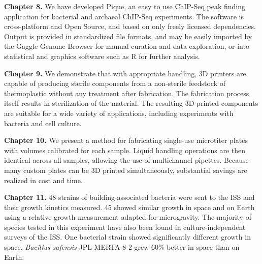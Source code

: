 \noindent\textbf{Chapter 8.} We have developed Pique, an easy to use ChIP-Seq
peak finding application for bacterial and archaeal ChIP-Seq experiments. The
software is cross-platform and Open Source, and based on only freely licensed
dependencies. Output is provided in standardized file formats, and may be
easily imported by the Gaggle Genome Browser for manual curation and data
exploration, or into statistical and graphics software such as R for further
analysis.


\noindent\textbf{Chapter 9.} We demonstrate that with
appropriate handling, 3D printers are capable of producing sterile components
from a non-sterile feedstock of thermoplastic without any treatment after
fabrication. The fabrication process itself results in sterilization of the
material. The resulting 3D printed components are suitable for a wide variety
of applications, including experiments with bacteria and cell culture.

\noindent\textbf{Chapter 10.} We present a method for
fabricating single-use microtiter plates with volumes calibrated for each
sample. Liquid handling operations are then identical across all samples,
allowing the use of multichannel pipettes. Because many custom plates can be
3D printed simultaneously, substantial savings are realized in cost and time.


\noindent\textbf{Chapter 11.} 48 strains of building-associated
bacteria were sent to the ISS and their growth kinetics measured. 45 showed
similar growth in space and on Earth using a relative growth measurement
adapted for microgravity. The majority of species tested in this experiment
have also been found in culture-independent surveys of the ISS. One bacterial
strain showed significantly different growth in space. {\em Bacillus safensis}
JPL-MERTA-8-2 grew 60\% better in space than on Earth.
